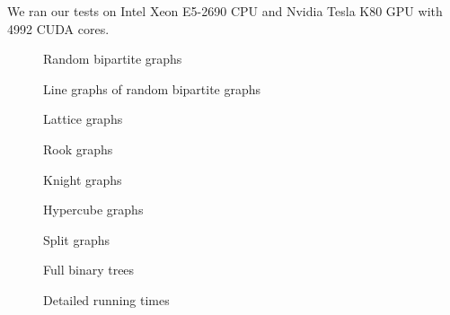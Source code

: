 We ran our tests on Intel Xeon E5-2690 CPU and Nvidia Tesla K80 GPU with 4992 CUDA cores.

%   

\begin{figure}
  \centering
  
  \caption{Random bipartite graphs}
  \label{plot:perf2Lines}
\end{figure}

\begin{figure}
  \centering
  
  \caption{Line graphs of random bipartite graphs}
  \label{plot:perf2Lines}
\end{figure}

\begin{figure}
  \centering
  
  \caption{Lattice graphs}
  \label{plot:gridLines}
\end{figure}

\begin{figure}
  \centering
  
  \caption{Rook graphs}
  \label{plot:rookLines}
\end{figure}

\begin{figure}
  \centering
  
  \caption{Knight graphs}
  \label{plot:knightLines}
\end{figure}

\begin{figure}
  \centering
  
  \caption{Hypercube graphs}
  \label{plot:hypercubeLines}
\end{figure}

\begin{figure}
  \centering
  
  \caption{Split graphs}
  \label{plot:splitLines}
\end{figure}

\begin{figure}
  \centering
  
  \caption{Full binary trees}
  \label{plot:splitLines}
\end{figure}

\begin{figure}
  \centering
  
  \caption{Detailed running times}
  \label{plot:perfDetailed}
\end{figure}

